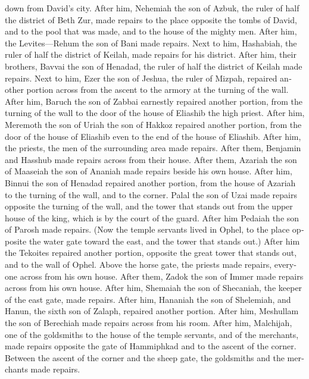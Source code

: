 \begin{paracol}{2}
\begin{otherlanguage}{english}
down from David's city.  After him, Nehemiah the son of
Azbuk, the ruler of half the district of Beth Zur, made repairs to the
place opposite the tombs of David, and to the pool that was made, and to
the house of the mighty men.  After him, the
Levites---Rehum the son of Bani made repairs. Next to him, Hashabiah,
the ruler of half the district of Keilah, made repairs for his district.
 After him, their brothers, Bavvai the son of Henadad,
the ruler of half the district of Keilah made repairs. 
Next to him, Ezer the son of Jeshua, the ruler of Mizpah, repaired
another portion across from the ascent to the armory at the turning of
the wall.  After him, Baruch the son of Zabbai earnestly
repaired another portion, from the turning of the wall to the door of
the house of Eliashib the high priest.  After him,
Meremoth the son of Uriah the son of Hakkoz repaired another portion,
from the door of the house of Eliashib even to the end of the house of
Eliashib.  After him, the priests, the men of the
surrounding area made repairs.  After them, Benjamin and
Hasshub made repairs across from their house. After them, Azariah the
son of Maaseiah the son of Ananiah made repairs beside his own house.
 After him, Binnui the son of Henadad repaired another
portion, from the house of Azariah to the turning of the wall, and to
the corner.  Palal the son of Uzai made repairs opposite
the turning of the wall, and the tower that stands out from the upper
house of the king, which is by the court of the guard. After him Pedaiah
the son of Parosh made repairs.  (Now the temple servants
lived in Ophel, to the place opposite the water gate toward the east,
and the tower that stands out.)  After him the Tekoites
repaired another portion, opposite the great tower that stands out, and
to the wall of Ophel.  Above the horse gate, the priests
made repairs, everyone across from his own house.  After
them, Zadok the son of Immer made repairs across from his own house.
After him, Shemaiah the son of Shecaniah, the keeper of the east gate,
made repairs.  After him, Hananiah the son of Shelemiah,
and Hanun, the sixth son of Zalaph, repaired another portion. After him,
Meshullam the son of Berechiah made repairs across from his room.
 After him, Malchijah, one of the goldsmiths to the house
of the temple servants, and of the merchants, made repairs opposite the
gate of Hammiphkad and to the ascent of the corner. 
Between the ascent of the corner and the sheep gate, the goldsmiths and
the merchants made repairs.


\end{otherlanguage}
\end{paracol}

